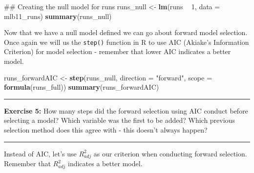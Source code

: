 \documentclass[]{book}
\newenvironment{Shaded}{\begin{snugshade}}{\end{snugshade}}
\newcommand{\DataTypeTok}[1]{\textcolor[rgb]{0.13,0.29,0.53}{#1}}
\newcommand{\DecValTok}[1]{\textcolor[rgb]{0.00,0.00,0.81}{#1}}
\newcommand{\KeywordTok}[1]{\textcolor[rgb]{0.13,0.29,0.53}{\textbf{#1}}}
\newcommand{\NormalTok}[1]{#1}
\newcommand{\OperatorTok}[1]{\textcolor[rgb]{0.81,0.36,0.00}{\textbf{#1}}}
\newcommand{\StringTok}[1]{\textcolor[rgb]{0.31,0.60,0.02}{#1}}
\theoremstyle{definition}
\theoremstyle{definition}
\theoremstyle{definition}
\theoremstyle{remark}
\begin{document}
\begin{Shaded}
\begin{Highlighting}[]
\NormalTok{## Creating the null model for runs}
\NormalTok{runs_null <-}\StringTok{ }\KeywordTok{lm}\NormalTok{(runs }\OperatorTok{~}\StringTok{ }\DecValTok{1}\NormalTok{, }\DataTypeTok{data =}\NormalTok{ mlb11_runs)}
\KeywordTok{summary}\NormalTok{(runs_null)}
\end{Highlighting}
\end{Shaded}

Now that we have a null model defined we can go about forward model
selection. Once again we will us the \texttt{step()} function in R to
use AIC (Akiake's Information Criterion) for model selection - remember
that lower AIC indicates a better model.

\begin{Shaded}
\begin{Highlighting}[]
\NormalTok{runs_forwardAIC <-}\StringTok{ }\KeywordTok{step}\NormalTok{(runs_null, }\DataTypeTok{direction =} \StringTok{"forward"}\NormalTok{, }\DataTypeTok{scope =} \KeywordTok{formula}\NormalTok{(runs_full))}
\KeywordTok{summary}\NormalTok{(runs_forwardAIC)}
\end{Highlighting}
\end{Shaded}

\begin{center}\rule{0.5\linewidth}{\linethickness}\end{center}

\textbf{Exercise 5:} How many steps did the forward selection using AIC
conduct before selecting a model? Which variable was the first to be
added? Which previous selection method does this agree with - this
doesn't always happen?

\begin{center}\rule{0.5\linewidth}{\linethickness}\end{center}

Instead of AIC, let's use \(R^2_{adj}\) as our criterion when conducting
forward selection. Remember that \(R^2_{adj}\) indicates a better model.
\end{document}
